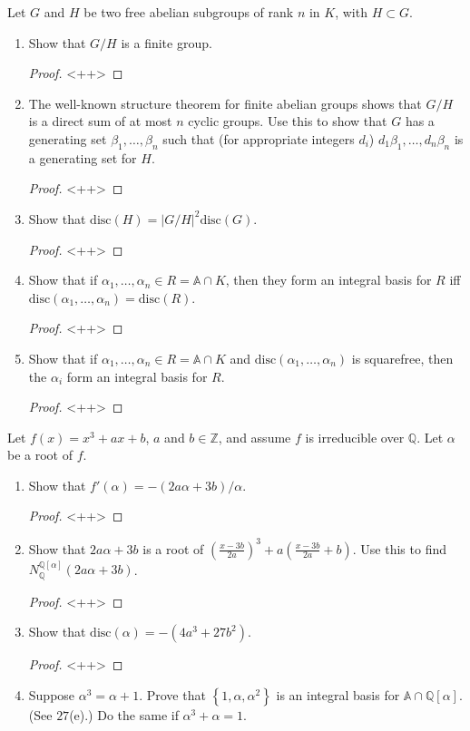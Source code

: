 \documentclass[12pt]{article}
\newcommand{\Q}{\mathbb{Q}}
\newcommand{\Z}{\mathbb{Z}}
\theoremstyle{definition}
\newenvironment{problem}[2][Problem]{\begin{trivlist}
\item[\hskip \labelsep {\bfseries #1}\hskip \labelsep {\bfseries #2.}]}{\end{trivlist}}
\begin{document}
\begin{problem}{27}
	Let $G$ and $H$ be two free abelian subgroups of rank $n$ in $K$, with $H \subset G$.
	\begin{enumerate}[label=(\alph*)]
		\item Show that $G/ H$ is a finite group.
			\begin{proof}
				<++>
			\end{proof}
		\item The well-known structure theorem for finite abelian groups shows that $G / H$ is a direct sum of at most $n$ cyclic groups. Use this to show that $G$ has a generating set $\beta_1, \dots , \beta_n$ such that (for appropriate integers $d_i$) $d_1\beta_1, \dots , d_n\beta_n$ is a generating set for $H$.
			\begin{proof}
				<++>
			\end{proof}
		\item Show that $\text{disc}(H) = \left \lvert { G/H } \right \lvert ^2\text{disc}(G)$.
			\begin{proof}
				<++>
			\end{proof}
		\item Show that if $\alpha_1, \dots , \alpha_n \in R = \mathbb A \cap K$, then they form an integral basis for $R$ iff $\text{disc}(\alpha_1, \dots , \alpha_n) = \text{disc}(R)$.
			\begin{proof}
				<++>
			\end{proof}
		\item Show that if $\alpha_1, \dots , \alpha_n \in R = \mathbb A \cap K$ and $\text{disc}(\alpha_1, \dots , \alpha_n)$ is squarefree, then the $\alpha_i$ form an integral basis for $R$.
			\begin{proof}
				<++>
			\end{proof}
	\end{enumerate}
\end{problem}
\begin{problem}{28}
	Let $f(x) = x^3 + ax + b$, $a$ and $b \in \Z$, and assume $f$ is irreducible over $\Q$. Let $\alpha$ be a root of $f$.
	\begin{enumerate}[label=(\alph*)]
		\item Show that $f'(\alpha) = -(2a\alpha + 3b)/ \alpha$.
			\begin{proof}
				<++>
			\end{proof}
		\item Show that $2a\alpha + 3b$ is a root of $\left( \frac{x - 3b}{2a} \right)^3 + a\left( \frac{x - 3b}{2a} + b \right)$. Use this to find $N_{\Q}^{\Q[\alpha]}(2a\alpha + 3b)$.
			\begin{proof}
				<++>
			\end{proof}
		\item Show that $\text{disc}(\alpha) = -(4a^3 + 27b^2)$.
			\begin{proof}
				<++>
			\end{proof}
		\item Suppose $\alpha^3 = \alpha + 1$. Prove that $\left\{ 1, \alpha, \alpha^2 \right\}$ is an integral basis for $\mathbb A \cap \Q[\alpha]$. (See $27$(e).) Do the same if $\alpha^3 + \alpha = 1$.
	\end{enumerate}
\end{problem}
\end{document}
